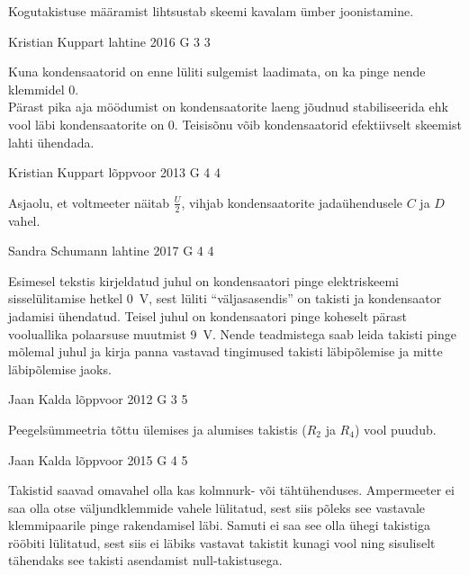 \documentclass[11pt]{article}
\begin{document}
{{\ifHint
Kogutakistuse määramist lihtsustab skeemi kavalam ümber joonistamine.
\fi
}

{Kristian Kuppart} %
{lahtine} %
{2016} %
{G 3} %
{3} %
{

\ifHint
Kuna kondensaatorid on enne lüliti sulgemist laadimata, on ka pinge nende klemmidel $0$.\\
Pärast pika aja möödumist on kondensaatorite laeng jõudnud stabiliseerida ehk vool läbi kondensaatorite on $0$. Teisisõnu võib kondensaatorid efektiivselt skeemist lahti ühendada.
\fi
}

{Kristian Kuppart} %
{lõppvoor} %
{2013} %
{G 4} %
{4} %
{

\ifHint
Asjaolu, et voltmeeter näitab $\frac{U}{2}$, vihjab kondensaatorite jadaühendusele $C$ ja $D$ vahel.
\fi
}

{Sandra Schumann} %
{lahtine} %
{2017} %
{G 4} %
{4} %
{

\ifHint
Esimesel tekstis kirjeldatud juhul on kondensaatori pinge elektriskeemi sisselülitamise hetkel \SI{0}{V}, sest lüliti \enquote{väljasasendis} on takisti ja kondensaator jadamisi ühendatud. Teisel juhul on kondensaatori pinge koheselt pärast vooluallika polaarsuse muutmist \SI{9}{V}. Nende teadmistega saab leida takisti pinge mõlemal juhul ja kirja panna vastavad tingimused takisti läbipõlemise ja mitte läbipõlemise jaoks.
\fi
}

{Jaan Kalda} %
{lõppvoor} %
{2012} %
{G 3} %
{5} %
{

\ifHint
Peegelsümmeetria tõttu ülemises ja alumises takistis ($R_2$ ja $R_4$) vool puudub. 
\fi
}

{Jaan Kalda} %
{lõppvoor} %
{2015} %
{G 4} %
{5} %
{

\ifHint
Takistid saavad omavahel olla kas kolmnurk- või tähtühenduses. Ampermeeter ei saa olla otse väljundklemmide vahele lülitatud, sest siis põleks see vastavale klemmipaarile pinge rakendamisel läbi. Samuti ei saa see olla ühegi takistiga rööbiti lülitatud, sest siis ei läbiks vastavat takistit kunagi vool ning sisuliselt tähendaks see takisti asendamist null-takistusega.
\fi
}

}
\end{document}
